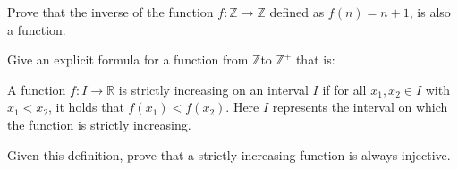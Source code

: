 \documentclass[a4paper]{exam}
\theoremstyle{definition}
\newcommand\Z{\ensuremath{\mathbb{Z}}}
\newcommand\R{\ensuremath{\mathbb{R}}}
\begin{document}
\begin{questions}
  
\question Prove that the inverse of the function $f: \Z\to\Z$ defined as \(f(n) = n+1\), is also a function.

  \begin{solution}
  \end{solution}
  
\question Give an explicit formula for a function from \Z to $\Z^+$ that is:

\question A function \(f: I \rightarrow \R\) is strictly increasing on an interval \(I\) if for all \(x_1, x_2 \in I\) with \(x_1 < x_2\), it holds that \(f(x_1) < f(x_2)\). Here $I$ represents the interval on which the function is strictly increasing.
  
  Given this definition, prove that a strictly increasing function is always injective.

  \begin{solution}
  \end{solution}
\end{questions}
\end{document}
